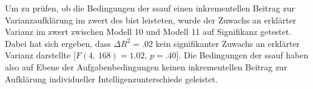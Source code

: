 \documentclass[11pt, twoside, a4paper]{book}		%
\begin{document}
Um zu prüfen, ob die Bedingungen der \gls{ssauf} einen inkrementellen Beitrag zur Varianzaufklärung im \gls{zwert} des \gls{bist} leisteten, wurde der Zuwachs an erklärter Varianz im \gls{zwert} zwischen Modell 10 und Modell 11 auf Signifikanz getestet. 
Dabei hat sich ergeben, dass $\Delta R^2=.02$ kein signifikanter Zuwachs an erklärter Varianz darstellte [$F(4,\,168)=1.02$, $p=.40$].
Die Bedingungen der \gls{ssauf} haben also auf Ebene der Aufgabenbedingungen keinen inkrementellen Beitrag zur Aufklärung individueller Intelligenzunterschiede geleistet.

\end{document}
